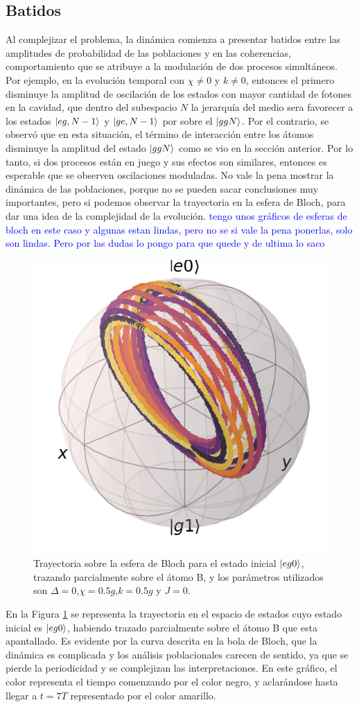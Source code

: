 \subsection{Batidos}

Al complejizar el problema, la dinámica comienza a presentar batidos entre las amplitudes de probabilidad de las poblaciones y en las coherencias, comportamiento que se atribuye a la modulación de dos procesos simultáneos. Por ejemplo, en la evolución temporal con $\chi\neq0$ y $k\neq0$, entonces el primero disminuye la amplitud de oscilación de los estados con mayor cantidad de fotones en la cavidad, que dentro del subespacio $N$ la jerarquía del medio sera favorecer a los estados $\ket{eg,N-1}$ y $\ket{ge,N-1}$ por sobre el $\ket{ggN}$. Por el contrario, se observó que en esta situación, el término de interacción entre los átomos disminuye la amplitud del estado $\ket{ggN}$ como se vio en la sección anterior. Por lo tanto, si dos procesos están en juego y sus efectos son similares, entonces es esperable que se observen oscilaciones moduladas. No vale la pena mostrar la dinámica de las poblaciones, porque no se pueden sacar conclusiones muy importantes, pero si podemos observar la trayectoria en la esfera de Bloch, para dar una idea de la complejidad de la evolución.
\textcolor{blue}{tengo unos gráficos de esferas de bloch en este caso y algunas estan lindas, pero no se si vale la pena ponerlas, solo son lindas. Pero por las dudas lo pongo para que quede y de ultima lo saco}
\begin{figure}[h]
    \centering
    \includegraphics[width=0.5\linewidth]{figuras/ch4/eg0 bloch AC a=0 d=0.0 x=0.5 k=0.5 J=0.0 gamma=0.0 p=0.0.png}
    \caption{Trayectoria sobre la esfera de Bloch para el estado inicial $\ket{eg0}$, trazando parcialmente sobre el átomo B, y los parámetros utilizados son $\Delta=0$,$\chi=0.5g$,$k=0.5g$ y $J=0$.}
    \label{fig4:eg0 bloch batidos}
\end{figure}
En la Figura \ref{fig4:eg0 bloch batidos} se representa la trayectoria en el espacio de estados cuyo estado inicial es $\ket{eg0}$, habiendo trazado parcialmente sobre el átomo B que esta apantallado. Es evidente por la curva descrita en la bola de Bloch, que la dinámica es complicada y los análisis poblacionales carecen de sentido, ya que se pierde la periodicidad y se complejizan las interpretaciones. En este gráfico, el color representa el tiempo comenzando por el color negro, y aclarándose hasta llegar a $t=7T$ representado por el color amarillo. 
